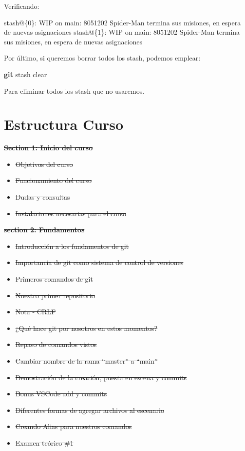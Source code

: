\documentclass[
]{book}
\newenvironment{Shaded}{\begin{snugshade}}{\end{snugshade}}
\newcommand{\ExtensionTok}[1]{#1}
\newcommand{\FunctionTok}[1]{\textcolor[rgb]{0.13,0.29,0.53}{\textbf{#1}}}
\newcommand{\NormalTok}[1]{#1}
\providecommand{\tightlist}{%
  \setlength{\itemsep}{0pt}\setlength{\parskip}{0pt}}
\begin{document}
Verificando:

\begin{Shaded}
\begin{Highlighting}[]
\ExtensionTok{stash@\{0\}:}\NormalTok{ WIP on main: 8051202 Spider{-}Man termina sus misiones, en espera de nuevas asignaciones}
\ExtensionTok{stash@\{1\}:}\NormalTok{ WIP on main: 8051202 Spider{-}Man termina sus misiones, en espera de nuevas asignaciones}
\end{Highlighting}
\end{Shaded}

Por último, si queremos borrar todos los stash, podemos emplear:

\begin{Shaded}
\begin{Highlighting}[]
\FunctionTok{git}\NormalTok{ stash clear}
\end{Highlighting}
\end{Shaded}

Para eliminar todos los stash que no usaremos.

\chapter{Estructura Curso}\label{estructura-curso}

\st{\textbf{Section 1: Inicio del curso}}

\begin{itemize}
\tightlist
\item
  \st{Objetivos del curso}
\item
  \st{Funcionamiento del curso}
\item
  \st{Dudas y consultas}
\item
  \st{Instalaciones necesarias para el curso}
\end{itemize}

\st{\textbf{section 2: Fundamentos}}

\begin{itemize}
\tightlist
\item
  \st{Introducción a los fundamentos de git}
\item
  \st{Importancia de git como sistema de control de versiones}
\item
  \st{Primeros comandos de git}
\item
  \st{Nuestro primer repositorio}
\item
  \st{Nota - CRLF}
\item
  \st{¿Qué hace git por nosotros en estos momentos?}
\item
  \st{Repaso de comandos vistos}
\item
  \st{Cambiar nombre de la rama ``master'' a ``main''}
\item
  \st{Demostración de la creación, puesta en escena y commits}
\item
  \st{Bonus VSCode add y commits}
\item
  \st{Diferentes formas de agregar archivos al escenario}
\item
  \st{Creando Alias para nuestros comandos}
\item
  \st{Examen teórico \#1}
\end{itemize}
\end{document}
